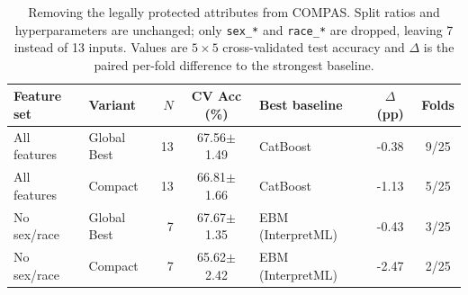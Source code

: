 \begin{table}[t]
\centering
\caption{Removing the legally protected attributes from COMPAS. Split ratios and hyperparameters are unchanged; only \texttt{sex\_*} and \texttt{race\_*} are dropped, leaving 7 instead of 13 inputs. Values are $5\times5$ cross-validated test accuracy and $\Delta$ is the paired per-fold difference to the strongest baseline.}
\label{tab:protected_ablation}
\setlength{\tabcolsep}{4pt}
\begin{tabular}{l l r c l c c}
\toprule
\textbf{Feature set} & \textbf{Variant} & \textbf{$N$} & \textbf{CV Acc (\%)} & \textbf{Best baseline} & \textbf{$\Delta$ (pp)} & \textbf{Folds} \\
\midrule
All features & Global Best & 13 & 67.56$\pm$1.49 & CatBoost & -0.38 & 9/25 \\
All features & Compact & 13 & 66.81$\pm$1.66 & CatBoost & -1.13 & 5/25 \\
No sex/race & Global Best & 7 & 67.67$\pm$1.35 & EBM (InterpretML) & -0.43 & 3/25 \\
No sex/race & Compact & 7 & 65.62$\pm$2.42 & EBM (InterpretML) & -2.47 & 2/25 \\
\bottomrule
\end{tabular}
\end{table}
